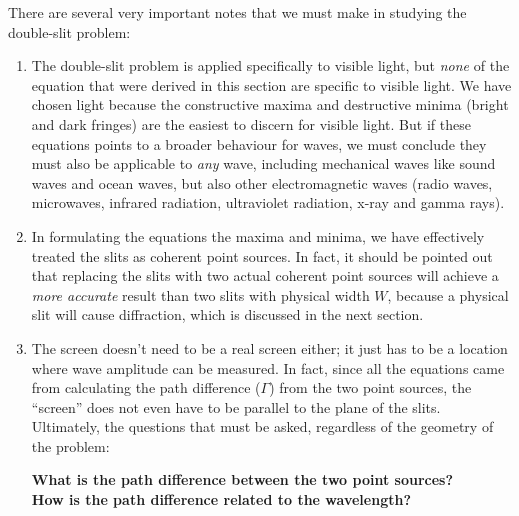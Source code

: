 \begin{common-question}
\begin{center}
\begin{tikzpicture}
    \end{tikzpicture}
    \hspace{\stretch1}
  \end{center}
\end{common-question}


There are several very important notes that we must make in studying the
double-slit problem:
\begin{enumerate}[itemsep=5pt]
\item The double-slit problem is applied specifically to visible light, but
  \emph{none} of the equation that were derived in this section are specific to
  visible light. We have chosen light because the constructive maxima and
  destructive minima (bright and dark fringes) are the easiest to discern for
  visible light. But if these equations points to a broader behaviour for
  waves, we must conclude they must also be applicable to \emph{any} wave,
  including mechanical waves like sound waves and ocean waves, but also other
  electromagnetic waves (radio waves, microwaves, infrared radiation,
  ultraviolet radiation, x-ray and gamma rays).

\item In formulating the equations the maxima and minima, we have effectively
  treated the slits as coherent point sources. In fact, it should be pointed
  out that replacing the slits with two actual coherent point sources will
  achieve a \emph{more accurate} result than two slits with physical width $W$,
  because a physical slit will cause diffraction, which is discussed in the
  next section.

\item The screen doesn't need to be a real screen either; it just
  has to be a location where wave amplitude can be measured. In fact, since
  all the equations came from calculating the path difference ($\Gamma$) from
  the two point sources, the ``screen'' does not even have to be parallel to
  the plane of the slits. Ultimately, the questions that must be asked,
  regardless of the geometry of the problem:
  \begin{center}
    \textbf{What is the path difference between the two point sources?\\
      How is the path difference related to the wavelength?}
  \end{center}
\end{enumerate}



